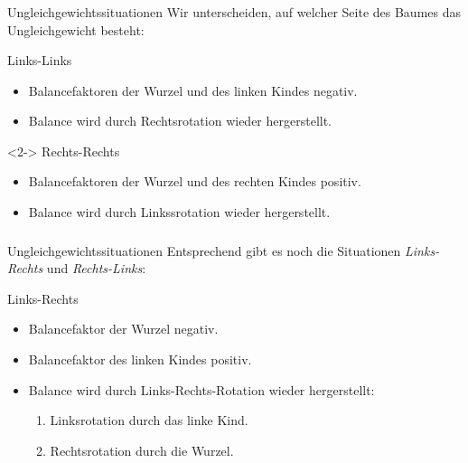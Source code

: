 \begin{frame}
\frametitle{\insertsection}
\begin{block}
{Ungleichgewichtssituationen}
Wir unterscheiden, auf welcher Seite des Baumes das Ungleichgewicht besteht:
\end{block}

\begin{block}
{Links-Links}
\begin{itemize}
	\item Balancefaktoren der Wurzel und des linken Kindes negativ.
	\item Balance wird durch Rechtsrotation wieder hergerstellt.
\end{itemize}
\end{block}
\begin{block}<2->
{Rechts-Rechts}
\begin{itemize}
	\item Balancefaktoren der Wurzel und des rechten Kindes positiv.
	\item Balance wird durch Linkssrotation wieder hergerstellt.
\end{itemize}
\end{block}
\end{frame}

\begin{frame}
\frametitle{\insertsection}
\begin{block}
{Ungleichgewichtssituationen}
Entsprechend gibt es noch die Situationen \emph{Links-Rechts} und \emph{Rechts-Links}:
\end{block}

\begin{block}
{Links-Rechts}
\begin{itemize}
	\item Balancefaktor der Wurzel negativ.
	\item Balancefaktor des linken Kindes positiv.
	\item Balance wird durch \alert{Links-Rechts-Rotation} wieder hergerstellt:
	\begin{enumerate}
		\item Linksrotation durch das linke Kind.
		\item Rechtsrotation durch die Wurzel.
	\end{enumerate}
\end{itemize}
\end{block}
\end{frame}


